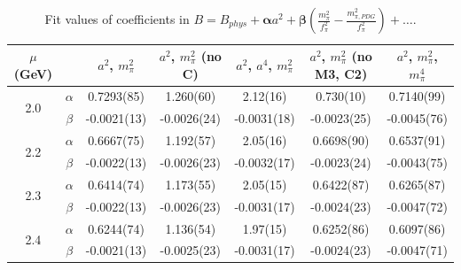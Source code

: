 \documentclass[12pt]{extarticle}
\begin{document}
\begin{table}[h!]
\begin{center}
\begin{tabular}{|c c|c|c|c|c|c|}
\hline
$\mu$ (GeV) &  & $a^2$, $m_\pi^2$& $a^2$, $m_\pi^2$ (no C)& $a^2$, $a^4$, $m_\pi^2$& $a^2$, $m_\pi^2$ (no M3, C2)& $a^2$, $m_\pi^2$, $m_\pi^4$\\
\hline
\multirow{2}{0.5in}{2.0} & $\alpha$ & 0.7293(85)& 1.260(60)& 2.12(16)& 0.730(10)& 0.7140(99)\\
 & $\beta$ & -0.0021(13)& -0.0026(24)& -0.0031(18)& -0.0023(25)& -0.0045(76)\\
\hline
\multirow{2}{0.5in}{2.2} & $\alpha$ & 0.6667(75)& 1.192(57)& 2.05(16)& 0.6698(90)& 0.6537(91)\\
 & $\beta$ & -0.0022(13)& -0.0026(23)& -0.0032(17)& -0.0023(24)& -0.0043(75)\\
\hline
\multirow{2}{0.5in}{2.3} & $\alpha$ & 0.6414(74)& 1.173(55)& 2.05(15)& 0.6422(87)& 0.6265(87)\\
 & $\beta$ & -0.0022(13)& -0.0026(23)& -0.0031(17)& -0.0024(23)& -0.0047(72)\\
\hline
\multirow{2}{0.5in}{2.4} & $\alpha$ & 0.6244(74)& 1.136(54)& 1.97(15)& 0.6252(86)& 0.6097(86)\\
 & $\beta$ & -0.0021(13)& -0.0025(23)& -0.0031(17)& -0.0024(23)& -0.0047(71)\\
\hline
\end{tabular}
\caption{Fit values of coefficients in $B = B_{phys} + \mathbf{\alpha} a^2 + \mathbf{\beta}\left(\frac{m_\pi^2}{f_\pi^2}-\frac{m_{\pi,PDG}^2}{f_\pi^2}\right) + \ldots$.}
\end{center}
\end{table}




















\clearpage
\end{document}
